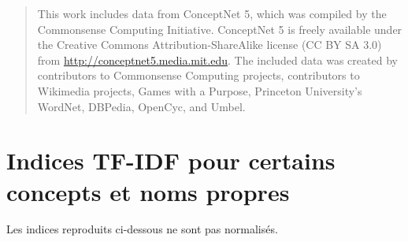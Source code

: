 \documentclass[a4paper, 12pt]{article}
\begin{document}
\begin{quotation}
 This work includes data from ConceptNet 5, which was compiled by the Commonsense Computing Initiative. ConceptNet 5 is freely available under the Creative Commons Attribution-ShareAlike license (CC BY SA 3.0) from \href{http://conceptnet5.media.mit.edu}{http://conceptnet5.media.mit.edu}. The included data was created by contributors to Commonsense Computing projects, contributors to Wikimedia projects, Games with a Purpose, Princeton University's WordNet, DBPedia, OpenCyc, and Umbel.
\end{quotation}

\nocite{*}
\printbibliography{}

\newpage
\appendix

\section{Indices TF-IDF pour certains concepts et noms propres}

Les indices reproduits ci-dessous ne sont pas normalisés.
\end{document}
